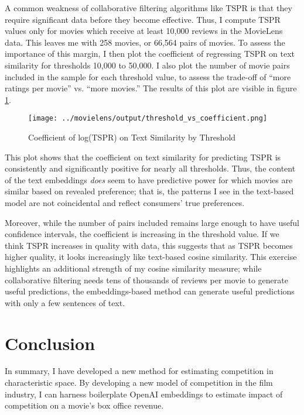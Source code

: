 \documentclass{article}
\begin{document}
A common weakness of collaborative filtering algorithms like TSPR is that they require significant data before they become effective. Thus, I compute TSPR values only for movies which receive at least 10,000 reviews in the MovieLens data. This leaves me with 258 movies, or 66,564 pairs of movies. To assess the importance of this margin, I then plot the coefficient of regressing TSPR on text similarity for thresholds 10,000 to 50,000. I also plot the number of movie pairs included in the sample for each threshold value, to assess the trade-off of ``more ratings per movie'' vs. ``more movies.'' The results of this plot are visible in figure \ref{fig:tspr_threshold}. 

\begin{figure}
    \begin{center}
    \texttt{[image: ../movielens/output/threshold\_vs\_coefficient.png]}
    \caption{Coefficient of log(TSPR) on Text Similarity by Threshold}
    \label{fig:tspr_threshold}
    \end{center}
\end{figure}

This plot shows that the coefficient on text similarity for predicting TSPR is consistently and significantly positive for nearly all thresholds. Thus, the content of the text embeddings \emph{does} seem to have predictive power for which movies are similar based on revealed preference; that is, the patterns I see in the text-based model are not coincidental and reflect consumers' true preferences. 

Moreover, while the number of pairs included remains large enough to have useful confidence intervals, the coefficient is increasing in the threshold value. If we think TSPR increases in quality with data, this suggests that as TSPR becomes higher quality, it looks increasingly like text-based cosine similarity. This exercise highlights an additional strength of my cosine similarity measure; while collaborative filtering needs tens of thousands of reviews per movie to generate useful predictions, the embeddings-based method can generate useful predictions with only a few sentences of text.


\section{Conclusion}

In summary, I have developed a new method for estimating competition in characteristic space. By developing a new model of competition in the film industry, I can harness boilerplate OpenAI embeddings to estimate impact of competition on a movie's box office revenue. 
\end{document}
